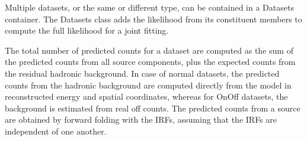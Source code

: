 Multiple datasets, or the same or different type, can be contained in a Datasets container. The Datasets class adds the likelihood from its constituent members to compute the full likelihood for a joint fitting.

The total number of predicted counts for a dataset are computed as the sum of the predicted counts from all source components, plus the expected counts from the residual hadronic background. In case of normal datasets, the predicted counts from the hadronic background are computed directly from the model in reconstructed energy and spatial coordinates, whereas for OnOff datasets, the background is estimated from real off counts. The predicted counts from a source are obtained by forward folding with the IRFs, assuming that the IRFs are independent of one another. 